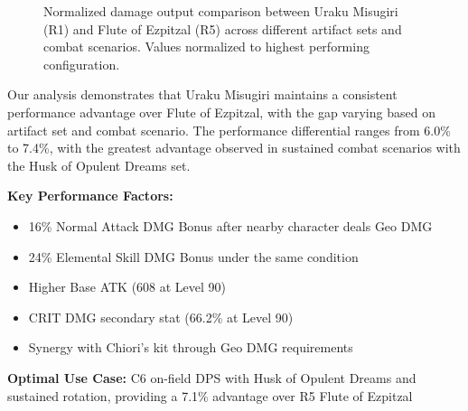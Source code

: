 \documentclass[12pt,a4paper]{article}
\begin{document}
\begin{figure}[H]
\centering
{}
\caption{Normalized damage output comparison between Uraku Misugiri (R1) and Flute of Ezpitzal (R5) across different artifact sets and combat scenarios. Values normalized to highest performing configuration.}
\label{fig:weapon_comparison}
\end{figure}

Our analysis demonstrates that Uraku Misugiri maintains a consistent performance advantage over Flute of Ezpitzal, with the gap varying based on artifact set and combat scenario. The performance differential ranges from 6.0\% to 7.4\%, with the greatest advantage observed in sustained combat scenarios with the Husk of Opulent Dreams set.

\begin{tcolorbox}[colback=geodark!5, colframe=geodark, title=Uraku Misugiri (R1)]
\textbf{Key Performance Factors:}
\begin{itemize}
    \item 16\% Normal Attack DMG Bonus after nearby character deals Geo DMG
    \item 24\% Elemental Skill DMG Bonus under the same condition
    \item Higher Base ATK (608 at Level 90)
    \item CRIT DMG secondary stat (66.2\% at Level 90)
    \item Synergy with Chiori's kit through Geo DMG requirements
\end{itemize}

\textbf{Optimal Use Case:} C6 on-field DPS with Husk of Opulent Dreams and sustained rotation, providing a 7.1\% advantage over R5 Flute of Ezpitzal
\end{tcolorbox}
\end{document}
